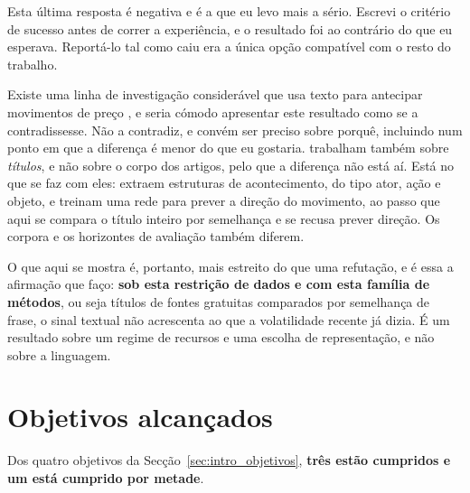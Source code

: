 Esta última resposta é negativa e é a que eu levo mais a sério. Escrevi o critério de sucesso antes
de correr a experiência, e o resultado foi ao contrário do que eu esperava. Reportá-lo tal como
caiu era a única opção compatível com o resto do trabalho.

Existe uma linha de investigação considerável que usa texto para antecipar movimentos de preço
\autocite{xing2018nlffsurvey, ding2015deep}, e seria cómodo apresentar este resultado como se a
contradissesse. Não a contradiz, e convém ser preciso sobre porquê, incluindo num ponto em que a
diferença é menor do que eu gostaria. \textcite{ding2015deep} trabalham também sobre \emph{títulos},
e não sobre o corpo dos artigos, pelo que a diferença não está aí. Está no que se faz com eles:
extraem estruturas de acontecimento, do tipo ator, ação e objeto, e treinam uma rede para prever a
direção do movimento, ao passo que aqui se compara o título inteiro por semelhança e se recusa
prever direção. Os corpora e os horizontes de avaliação também diferem.

O que aqui se mostra é, portanto, mais estreito do que uma refutação, e é essa a afirmação que faço:
\textbf{sob esta restrição de dados e com esta família de métodos}, ou seja títulos de fontes
gratuitas comparados por semelhança de frase, o sinal textual não acrescenta ao que a volatilidade
recente já dizia. É um resultado sobre um regime de recursos e uma escolha de representação, e não
sobre a linguagem.

\section{Objetivos alcançados}
\label{sec:con_objetivos}

Dos quatro objetivos da Secção~\ref{sec:intro_objetivos}, \textbf{três estão cumpridos e um está
cumprido por metade}.

